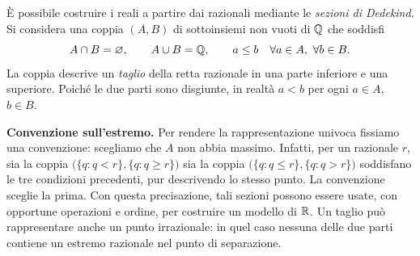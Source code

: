 È possibile costruire i reali a partire dai razionali mediante le \emph{sezioni di Dedekind}. Si considera una coppia $(A,B)$ di sottoinsiemi non vuoti di $\mathbb{Q}$ che soddisfi
\[
  A\cap B=\varnothing,\qquad A\cup B=\mathbb{Q},\qquad
  a\le b\quad\forall a\in A,\ \forall b\in B.
\]
La coppia descrive un \emph{taglio} della retta razionale in una parte inferiore e una superiore. Poiché le due parti sono disgiunte, in realtà $a<b$ per ogni $a\in A$, $b\in B$.

\textbf{Convenzione sull'estremo.} Per rendere la rappresentazione univoca fissiamo una convenzione: scegliamo che $A$ non abbia massimo. Infatti, per un razionale $r$, sia la coppia $\bigl(\{q:q<r\},\{q:q\ge r\}\bigr)$ sia la coppia $\bigl(\{q:q\le r\},\{q:q>r\}\bigr)$ soddisfano le tre condizioni precedenti, pur descrivendo lo stesso punto. La convenzione sceglie la prima. Con questa precisazione, tali sezioni possono essere usate, con opportune operazioni e ordine, per costruire un modello di $\mathbb{R}$. Un taglio può rappresentare anche un punto irrazionale: in quel caso nessuna delle due parti contiene un estremo razionale nel punto di separazione.
